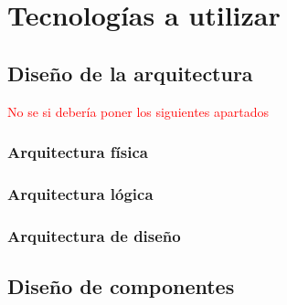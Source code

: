 \chapter{Tecnologías a utilizar}
\section{Diseño de la arquitectura}
\textcolor{red}{No se si debería poner los siguientes apartados}
\subsection{Arquitectura física}


\subsection{Arquitectura lógica}


\subsection{Arquitectura de diseño}


\section{Diseño de componentes}
